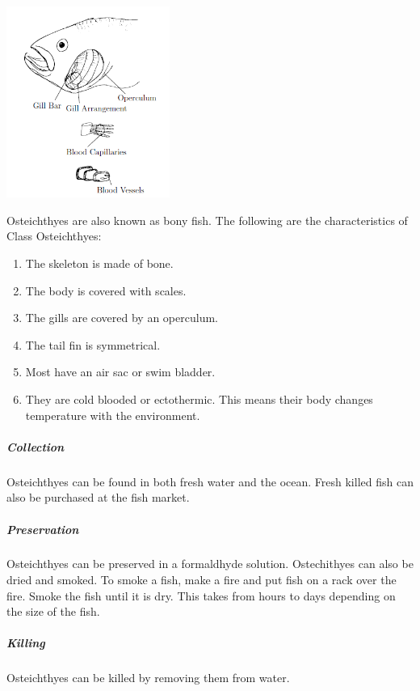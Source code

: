 \begin{multicols}{2}
\begin{center}
\includegraphics[width=0.4\textwidth]{./img/fish.png}
\end{center}

Osteichthyes are also known as bony fish. The following are the characteristics of Class Osteichthyes:
\begin{enumerate}
\item{The skeleton is made of bone.}
\item{The body is covered with scales.}
\item{The gills are covered by an operculum.}
\item{The tail fin is symmetrical.}
\item{Most have an air sac or swim bladder.}
\item{They are cold blooded or ectothermic. This means their body changes temperature with the environment.}
\end{enumerate}

\subparagraph{Collection}
 Osteichthyes can be found in both fresh water and the ocean. Fresh killed fish can also be purchased at the fish market.

\subparagraph{Preservation} 
Osteichthyes can be preserved in a formaldhyde solution. Ostechithyes can also be dried and smoked. 
To smoke a fish, make a fire and put fish on a rack over the fire. Smoke the fish until it is dry. This takes from hours to days depending on the size of the fish.

%

\subparagraph{Killing}
Osteichthyes can be killed by removing them from water. 


\end{multicols}
